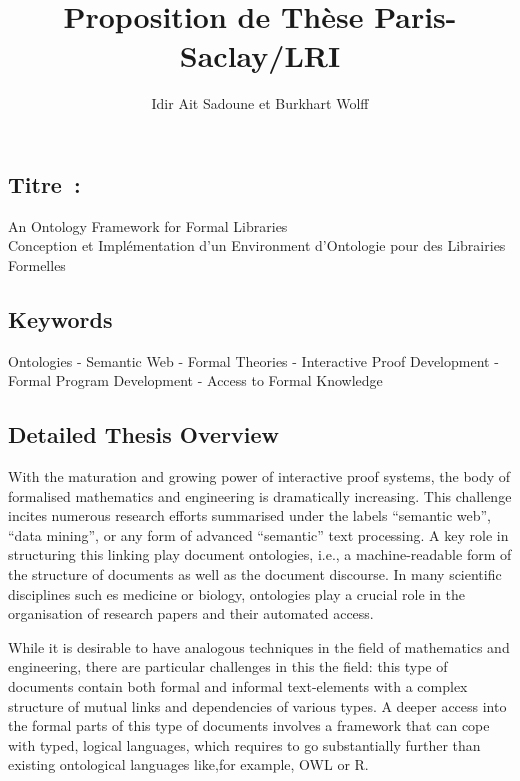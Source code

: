 \documentclass[a4paper,10pt]{article}
\begin{document}
\title{\textbf{Proposition de Thèse Paris-Saclay/LRI}}
\author{Idir Ait Sadoune et Burkhart Wolff}
\date{}

\maketitle

\subsection*{Titre~:}
\begin{center}
\large An Ontology Framework for Formal Libraries \\
  Conception et Implémentation d'un Environment d'Ontologie
  pour des Librairies Formelles
\end{center}

\subsection{Keywords}

Ontologies - Semantic Web - Formal Theories - Interactive Proof Development
- Formal Program Development - Access to Formal Knowledge

\subsection*{Detailed Thesis Overview}

With the maturation and growing power of interactive proof systems,
the body of formalised mathematics and engineering is dramatically increasing.
This challenge incites numerous research efforts
summarised under the labels “semantic web”, “data mining”,
or any form of advanced “semantic” text processing.
A key role in structuring this linking play document ontologies,
i.e., a machine-readable form of the structure of documents
as well as the document discourse.
In many scientific disciplines such es medicine or biology,
ontologies play a crucial role in the organisation of research papers
and their automated access.

While it is desirable to have analogous techniques
in the field of mathematics and engineering,
there are particular challenges in this the field:
this type of documents contain both formal and informal text-elements
with a complex structure of mutual links and dependencies of various types.
A deeper access into the formal parts of this type of documents involves
a framework that can cope with typed, logical languages,
which requires to go substantially further
than existing ontological languages
like,for example, OWL or R\cite{owl2012,protege,owlgred,rontorium}.
\end{document}
